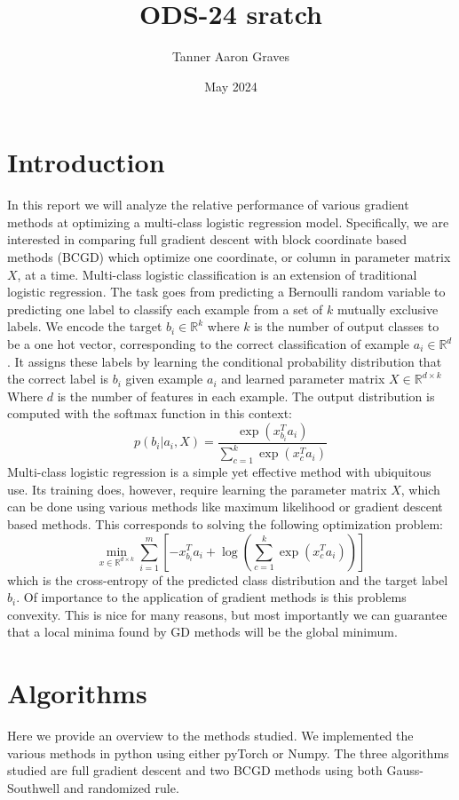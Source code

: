 \documentclass{article}
\title{ODS-24 sratch}
\author{Tanner Aaron Graves}
\date{May 2024}
\begin{document}
\maketitle

\section{Introduction}
In this report we will analyze the relative performance of various gradient methods at optimizing a multi-class logistic regression model. Specifically, we are interested in comparing full gradient descent with block coordinate based methods (BCGD) which optimize one coordinate, or column in parameter matrix $X$, at a time. 
Multi-class logistic classification is an extension of traditional logistic regression. The task goes from predicting a Bernoulli random variable to predicting one label to classify each example from a set of $k$ mutually exclusive labels. We encode the target $b_i \in \mathbb{R}^k$ where $k$ is the number of output classes to be a one hot vector, corresponding to the correct classification of example $a_i \in \mathbb{R}^d$. It assigns these labels by learning the conditional probability distribution that the correct label is $b_i$ given example $a_i$ and learned parameter matrix $X \in \mathbb{R}^{d \times k}$ Where $d$ is the number of features in each example. The output distribution is computed with the softmax function in this context: 
$$p(b_i|a_i, X) = \frac{\exp(x_{b_i}^T a_i)}{\sum_{c=1}^k\exp(x_c^Ta_i)}$$
Multi-class logistic regression is a simple yet effective method with ubiquitous use. Its training does, however, require learning the parameter matrix $X$, which can be done using various methods like maximum likelihood or gradient descent based methods. This corresponds to solving the following optimization problem:
$$\min_{x\in\mathbb{R}^{d\times k}} \sum\limits_{i=1}^{m}[-x^T_{b_i}a_{i}+ \log(\sum\limits_{c=1}^k\exp(x_c^{T}a_i))]$$
which is the cross-entropy of the predicted class distribution and the target label $b_i$. Of importance to the application of gradient methods is this problems convexity. This is nice for many reasons, but most importantly we can guarantee that a local minima found by GD methods will be the global minimum.

\section{Algorithms}
Here we provide an overview to the methods studied. We implemented the various methods in python using either pyTorch or Numpy. The three algorithms studied are full gradient descent and two BCGD methods using both Gauss-Southwell and randomized rule.  
\end{document}
